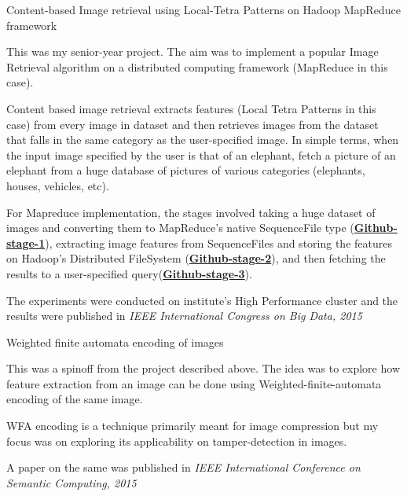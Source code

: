 
\begin{cventries}
  \majprojentry
    {Content-based Image retrieval using Local-Tetra Patterns on Hadoop MapReduce framework}
    {
      \begin{cvitems} %
        \item {This was my senior-year project. The aim was to implement a popular Image Retrieval algorithm on a distributed computing framework (MapReduce in this case).}
        \item {Content based image retrieval extracts features (Local Tetra Patterns in this case) from every image in dataset and then retrieves images from the dataset that falls in the same category as the user-specified image. In simple terms, when the input image specified by the user is that of an elephant, fetch a picture of an elephant from a huge database of pictures of various categories (elephants, houses, vehicles, etc).}
        \item {For Mapreduce implementation, the stages involved taking a huge dataset of images and converting them to MapReduce's native SequenceFile type (\textbf{\href{https://github.com/sg1993/sequencify-CBIR-on-hadoop}{Github-stage-1}}), extracting image features from SequenceFiles and storing the features on Hadoop's Distributed FileSystem (\textbf{\href{https://github.com/sg1993/CBIR-on-Hadoop}{Github-stage-2}}), and then fetching the results to a user-specified query(\textbf{\href{https://github.com/sg1993/CBIR-query-on-Hadoop}{Github-stage-3}}).}
        \item {The experiments were conducted on institute's High Performance cluster and the results were published in \textit{IEEE International Congress on Big Data, 2015}}
      \end{cvitems}
    }
  \majprojentry
    {Weighted finite automata encoding of images}
    {
      \begin{cvitems} %
        \item {This was a spinoff from the project described above. The idea was to explore how feature extraction from an image can be done using Weighted-finite-automata encoding of the same image.}
        \item {WFA encoding is a technique primarily meant for image compression but my focus was on exploring its applicability on tamper-detection in images.}
        \item {A paper on the same was published in \textit{IEEE International Conference on Semantic Computing, 2015} }
      \end{cvitems}
    }
    

\end{cventries}

